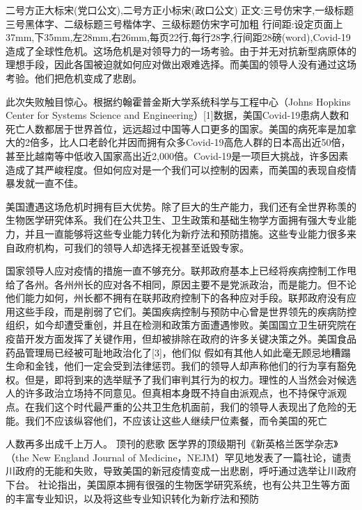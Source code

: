 \documentclass[12pt,twoside]{ctexart}
\begin{document}
\bantou[中央军委训练管理部办公厅]

二号方正大标宋(党口公文),二号方正小标宋(政口公文) 正文:三号仿宋字,一级标题三号黑体字、二级标题三号楷体字、三级标题仿宋字可加粗 行间距:设定页面上37mm,下35mm,左28mm,右26mm,每页22行,每行28字,行间距28磅(word),Covid-19造成了全球性危机。这场危机是对领导力的一场考验。由于并无对抗新型病原体的理想手段，因此各国被迫就如何应对做出艰难选择。而美国的领导人没有通过这场考验。他们把危机变成了悲剧。

此次失败触目惊心。根据约翰霍普金斯大学系统科学与工程中心（Johns Hopkins Center for Systems Science and Engineering）[1]数据，美国Covid-19患病人数和死亡人数都居于世界首位，远远超过中国等人口更多的国家。美国的病死率是加拿大的2倍多，比人口老龄化并因而拥有众多Covid-19高危人群的日本高出近50倍，甚至比越南等中低收入国家高出近2,000倍。Covid-19是一项巨大挑战，许多因素造成了其严峻程度。但如何应对是一个我们可以控制的因素，而美国的表现自疫情暴发就一直不佳。

美国遭遇这场危机时拥有巨大优势。除了巨大的生产能力，我们还有全世界称羡的生物医学研究体系。我们在公共卫生、卫生政策和基础生物学方面拥有强大专业能力，并且一直能够将这些专业能力转化为新疗法和预防措施。这些专业能力很多来自政府机构，可我们的领导人却选择无视甚至诋毁专家。

国家领导人应对疫情的措施一直不够充分。联邦政府基本上已经将疾病控制工作甩给了各州。各州州长的应对各不相同，原因主要不是党派政治，而是能力。但不论他们能力如何，州长都不拥有在联邦政府控制下的各种应对手段。联邦政府没有应用这些手段，而是削弱了它们。美国疾病控制与预防中心曾是世界领先的疾病防控组织，如今却遭受重创，并且在检测和政策方面遭遇惨败。美国国立卫生研究院在疫苗开发方面发挥了关键作用，但却被排除在政府的许多关键决策之外。美国食品药品管理局已经被可耻地政治化了[3]，他们似
假如有其他人如此毫无顾忌地糟蹋生命和金钱，他们一定会受到法律惩罚。我们的领导人却声称他们的行为享有豁免权。但是，即将到来的选举赋予了我们审判其行为的权力。理性的人当然会对候选人的许多政治立场持不同意见。但真相本身既不持自由派观点，也不持保守派观点。在我们这个时代最严重的公共卫生危机面前，我们的领导人表现出了危险的无能。我们不应该纵容他们，不应该让这些人继续尸位素餐，而令美国的死亡

人数再多出成千上万人。
顶刊的悲歌
医学界的顶级期刊《新英格兰医学杂志》（the New England Journal of Medicine，NEJM）罕见地发表了一篇社论，谴责川政府的无能和失败，导致美国的新冠疫情变成一出悲剧，呼吁通过选举让川政府下台。
社论指出，美国原本拥有很强的生物医学研究系统，也有公共卫生等方面的丰富专业知识，以及将这些专业知识转化为新疗法和预防
\newlength{\bottomheight}
\setlength{\bottomheight}{7\baselineskip}
\the\bottomheight
\the{}

\end{document}
